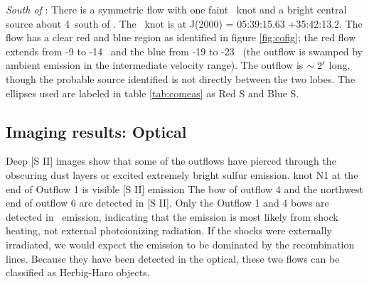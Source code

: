 

{\it South of \region}: 
There is a symmetric flow with one faint \hh\ knot and a bright central source
about 4\arcmin\ south of \region.  The \hh\ knot is at J(2000) = 05:39:15.63 +35:42:13.2.
The flow has a clear red and blue region as identified in figure
\ref{fig:cofig}; the red flow extends from -9 to -14 \kms\ and the blue from -19
to -23 \kms\ (the outflow is swamped by ambient emission in the intermediate
velocity range).  The outflow is $\sim 2\mbox{$^\prime$}$ long, though the probable
source identified is not directly between the two lobes.  The ellipses used are
labeled in table \ref{tab:comeas} as Red S and Blue S.



\subsection{Imaging results: Optical}
Deep [S II] images show that some of the outflows have pierced through the
obscuring dust layers or excited extremely bright sulfur emission.
\citet{khanzadyan2004} knot N1 at the end of Outflow 1 is visible [S II] emission
The bow of outflow 4 and the northwest end of outflow 6 are
detected in [S II].  Only the Outflow 1 and 4 bows are detected in \ha\ 
emission, indicating that the emission is most likely from shock heating, not
external photoionizing radiation.  If the shocks were externally irradiated, we
would expect the emission to be dominated by the recombination lines.  Because
they have been detected in the optical, these two flows can be classified
as Herbig-Haro objects.




